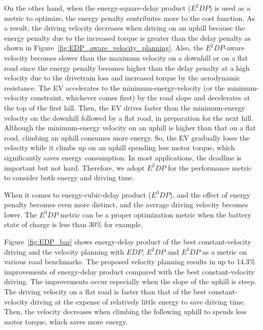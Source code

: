 \documentclass{IEEEtran}
\begin{document}
On the other hand, when the energy-square-delay product ($E^2DP$) is used as a metric to optimize, the energy penalty contributes more to the cost function. As a result, the driving velocity decreases when driving on an uphill because the energy penalty due to the increased torque is greater than the delay penalty as shown in Figure~\ref{fig:EDP_aware_velocity_planning}. Also, the $E^2DP$-aware velocity becomes slower than the maximum velocity on a downhill or on a flat road since the energy penalty becomes higher than the delay penalty at a high velocity due to the drivetrain loss and increased torque by the aerodynamic resistance. The EV accelerates to the minimum-energy-velocity (or the minimum-velocity constraint, whichever comes first) by the road slope and decelerates at the top of the first hill. Then, the EV drives faster than the minimum-energy velocity on the downhill followed by a  flat road, in preparation for the next hill. Although the minimum-energy velocity on an uphill is higher than that on a flat road, climbing an uphill consumes more energy. So, the EV gradually loses the velocity while it climbs up on an uphill spending less motor torque, which significantly saves energy consumption. In most applications, the deadline is important but not hard. Therefore, we adopt $E^2DP$ for the performance metric to consider both energy and driving time.

When it comes to energy-cubic-delay product ($E^3DP$), and the effect of energy penalty becomes even more distinct, and the average driving velocity becomes lower. 
The $E^3DP$ metric can be a proper optimization metric when the battery state of charge is less than 30\% for example.

Figure~\ref{fig:EDP_bar} shows energy-delay product of the best constant-velocity driving and the velocity planning with $EDP$, $E^2DP$ and $E^3DP$ as a metric on various road benchmarks. The proposed velocity planning results in up to 14.3\% improvements of energy-delay product compared with the best constant-velocity driving. The improvements occur especially when the slope of the uphill is steep. The driving velocity on a flat road is faster than that of the best constant-velocity driving at the expense of relatively little energy to save driving time. Then, the velocity decreases when climbing the following uphill to spends less motor torque, which saves more energy.
\end{document}
